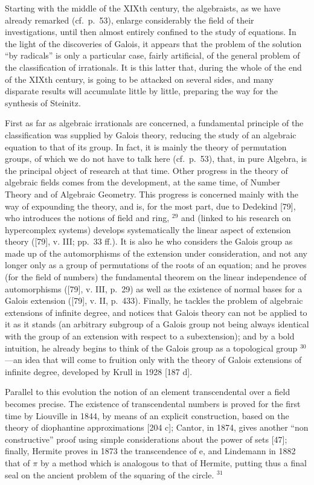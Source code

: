 Starting with the middle of the XIXth century, the algebraists, as we have already remarked (cf.~p.~53), enlarge considerably the field of their investigations, until then almost entirely confined to the study of equations. In the light of the discoveries of Galois, it appears that the problem of the solution ``by radicals'' is only a particular case, fairly artificial, of the general problem of the classification of irrationals. It is this latter that, during the whole of the end of the XIXth century, is going to be attacked on several sides, and many disparate results will accumulate little by little, preparing the way for the synthesis of Steinitz.

First as far as algebraic irrationals are concerned, a fundamental principle of the classification was supplied by Galois theory, reducing the study of an algebraic equation to that of its group. In fact, it is mainly the theory of permutation groups, of which we do not have to talk here (cf.~p.~53), that, in pure Algebra, is the principal object of research at that time. Other progress in the theory of algebraic fields comes from the development, at the same time, of Number Theory and of Algebraic Geometry. This progress is concerned mainly with the way of expounding the theory, and is, for the most part, due to Dedekind {[}79{]}, who introduces the notions of field and ring, \(^{29}\) and (linked to his research on hypercomplex systems) develops systematically the linear aspect of extension theory ({[}79{]}, v. III; pp.~33 ff.). It is also he who considers the Galois group as made up of the automorphisms of the extension under consideration, and not any longer only as a group of permutations of the roots of an equation; and he proves (for the field of numbers) the fundamental theorem on the linear independence of automorphisms ({[}79{]}, v. III, p.~29) as well as the existence of normal bases for a Galois extension ({[}79{]}, v. II, p.~433). Finally, he tackles the problem of algebraic extensions of infinite degree, and notices that Galois theory can not be applied to it as it stands (an arbitrary subgroup of a Galois group not being always identical with the group of an extension with respect to a subextension); and by a bold intuition, he already begins to think of the Galois group as a topological group \(^{30}\) ---an idea that will come to fruition only with the theory of Galois extensions of infinite degree, developed by Krull in 1928 {[}187 d{]}.

Parallel to this evolution the notion of an element transcendental over a field becomes precise. The existence of transcendental numbers is proved for the first time by Liouville in 1844, by means of an explicit construction, based on the theory of diophantine approximations {[}204 c{]}; Cantor, in 1874, gives another ``non constructive'' proof using simple considerations about the power of sets {[}47{]}; finally, Hermite proves in 1873 the transcendence of e, and Lindemann in 1882 that of \(\pi\) by a method which is analogous to that of Hermite, putting thus a final seal on the ancient problem of the squaring of the circle. \(^{31}\)

